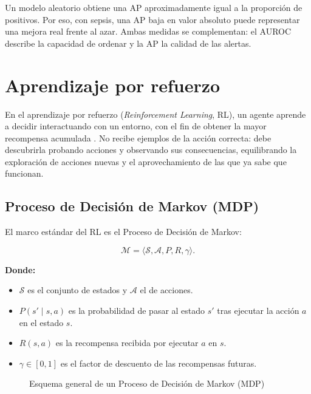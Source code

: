 Un modelo aleatorio obtiene una AP aproximadamente igual a la proporción de positivos. Por
eso, con sepsis, una AP baja en valor absoluto puede representar una mejora real frente al
azar. Ambas medidas se complementan: el AUROC describe la capacidad de ordenar y la AP la
calidad de las alertas.

\section{Aprendizaje por refuerzo}

En el aprendizaje por refuerzo (\textit{Reinforcement Learning}, RL), un agente aprende a
decidir interactuando con un entorno, con el fin de obtener la mayor recompensa acumulada
\cite{sutton2018rl}. No recibe ejemplos de la acción correcta: debe descubrirla probando
acciones y observando sus consecuencias, equilibrando la exploración de acciones nuevas y
el aprovechamiento de las que ya sabe que funcionan.

\subsection{Proceso de Decisión de Markov (MDP)}
\label{sec:mdp}

El marco estándar del RL es el Proceso de Decisión de Markov:

\begin{equation}
    \mathcal{M} = \langle \mathcal{S}, \mathcal{A}, P, R, \gamma \rangle.
    \label{eq:mdp_tuple}
\end{equation}

\noindent\textbf{Donde:}
\begin{itemize}
    \item $\mathcal{S}$ es el conjunto de estados y $\mathcal{A}$ el de acciones.
    \item $P(s' \mid s,a)$ es la probabilidad de pasar al estado $s'$ tras ejecutar la acción $a$ en el estado $s$.
    \item $R(s,a)$ es la recompensa recibida por ejecutar $a$ en $s$.
    \item $\gamma \in [0,1]$ es el factor de descuento de las recompensas futuras.
\end{itemize}

\begin{figure}[H]
    \centering
    
    \caption{Esquema general de un Proceso de Decisión de Markov (MDP)}
    \label{fig:mdp}
\end{figure}

